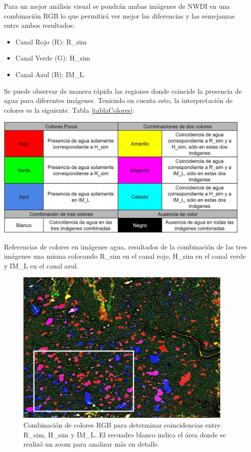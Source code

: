 \documentclass[10pt,a4paper, twoside]{report}
\begin{document}
Para un mejor análisis visual se pondrán ambas imágenes de NWDI en una combinación RGB lo que permitirá ver mejor las diferencias y las semejanzas entre ambos resultados:

\begin{itemize}
	\item Canal Rojo (R): R\_sim
	\item Canal Verde (G): H\_sim
	\item Canal Azul (B): IM\_L
\end{itemize}

Se puede observar de manera rápida las regiones donde coincide la presencia de agua para diferentes imágenes. Teniendo en cuenta esto, la interpretación de colores es la siguiente. Tabla \ref{tablaColores}:

\begin{table}[H]
   \centering      
   \includegraphics[width=0.95\textwidth]{imagenes/tablaColores.jpg}
 \caption{Referencias de colores en imágenes agua, resultados de la combinación de las tres imágenes una misma colocando R\_sim en el canal rojo, H\_sim en el canal verde y IM\_L en el canal azul.}
 \label{tablaColores}
\end{table}

\begin{figure}[!htb]
   \centering      
   \includegraphics[width=0.95\textwidth]{imagenes/RGBDia10.jpg}
 \caption{Combinación de colores RGB para determinar coincidencias entre R\_sim, H\_sim y IM\_L. El recuadro blanco indica el área donde se realizó un zoom para analizar más en detalle.}
 \label{RGBDia10}
\end{figure}
\end{document}
